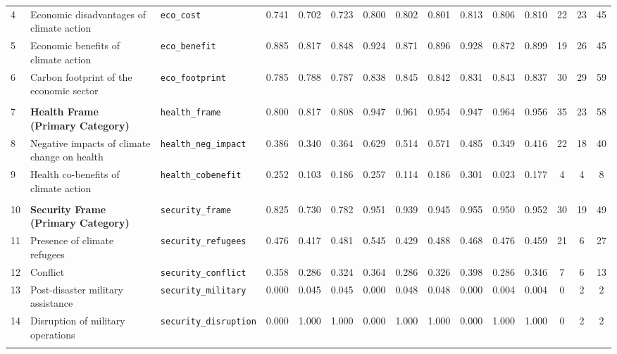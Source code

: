 \begin{longtable}{p{0.4cm}p{4.0cm}p{3.0cm}cccccccccccc}
4 & Economic disadvantages of climate action & \texttt{eco\_cost} & 0.741 & 0.702 & 0.723 & 0.800 & 0.802 & 0.801 & 0.813 & 0.806 & 0.810 & 22 & 23 & 45 \\
5 & Economic benefits of climate action & \texttt{eco\_benefit} & 0.885 & 0.817 & 0.848 & 0.924 & 0.871 & 0.896 & 0.928 & 0.872 & 0.899 & 19 & 26 & 45 \\
6 & Carbon footprint of the economic sector & \texttt{eco\_footprint} & 0.785 & 0.788 & 0.787 & 0.838 & 0.845 & 0.842 & 0.831 & 0.843 & 0.837 & 30 & 29 & 59 \\
\midrule
\rowcolor{gray!8}
\multicolumn{15}{l}{\textit{Health Frame}} \\
\midrule
7 & \textbf{Health Frame\newline (Primary Category)} & \texttt{health\_frame} & 0.800 & 0.817 & 0.808 & 0.947 & 0.961 & 0.954 & 0.947 & 0.964 & 0.956 & 35 & 23 & 58 \\
\cmidrule(lr){1-15}
8 & Negative impacts of climate change on health & \texttt{health\_neg\_impact} & 0.386 & 0.340 & 0.364 & 0.629 & 0.514 & 0.571 & 0.485 & 0.349 & 0.416 & 22 & 18 & 40 \\
9 & Health co-benefits of climate action & \texttt{health\_cobenefit} & 0.252 & 0.103 & 0.186 & 0.257 & 0.114 & 0.186 & 0.301 & 0.023 & 0.177 & 4 & 4 & 8 \\
\midrule
\rowcolor{gray!8}
\multicolumn{15}{l}{\textit{Security Frame}} \\
\midrule
10 & \textbf{Security Frame\newline (Primary Category)} & \texttt{security\_frame} & 0.825 & 0.730 & 0.782 & 0.951 & 0.939 & 0.945 & 0.955 & 0.950 & 0.952 & 30 & 19 & 49 \\
\cmidrule(lr){1-15}
11 & Presence of climate refugees & \texttt{security\_refugees} & 0.476 & 0.417 & 0.481 & 0.545 & 0.429 & 0.488 & 0.468 & 0.476 & 0.459 & 21 & 6 & 27 \\
12 & Conflict & \texttt{security\_conflict} & 0.358 & 0.286 & 0.324 & 0.364 & 0.286 & 0.326 & 0.398 & 0.286 & 0.346 & 7 & 6 & 13 \\
13 & Post-disaster military assistance & \texttt{security\_military} & 0.000 & 0.045 & 0.045 & 0.000 & 0.048 & 0.048 & 0.000 & 0.004 & 0.004 & 0 & 2 & 2 \\
14 & Disruption of military operations & \texttt{security\_disruption} & 0.000 & 1.000 & 1.000 & 0.000 & 1.000 & 1.000 & 0.000 & 1.000 & 1.000 & 0 & 2 & 2 \\
\midrule
\rowcolor{gray!8}
\multicolumn{15}{l}{\textit{Justice Frame}} \\

\end{longtable}
